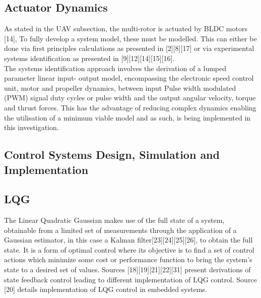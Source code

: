 \documentclass[12pt,a4paper,twoside]{report}
\begin{document}
			\subsection*{Actuator Dynamics}	
				As stated in the UAV subsection, the multi-rotor is actuated by BLDC motors [14], To fully develop a system model, these must be modelled. This can either be done via first principles calculations as presented in [2][8][17] or via experimental systems identification as presented in [9][12][14][15][16]. 
				\\
				The systems identification approach involves the derivation of a lumped parameter linear input- output model, encompassing the electronic speed control unit, motor and propeller dynamics, between input Pulse width modulated (PWM) signal duty cycles or pulse width and the output angular velocity, torque and thrust forces. This has the advantage of reducing complex dynamics enabling the utilisation of a minimum viable model and as such, is being implemented in this investigation.
				
		\subsection{Control Systems Design, Simulation and Implementation}
		
			\subsection*{LQG}
				The Linear Quadratic Gaussian makes use of the full state of a system, obtainable from a limited set of measurements through the application of a Gaussian estimator, in this case a Kalman filter[23][24][25][26], to obtain the full state. It is a form of optimal control where its objective is to find a set of control actions which minimize some cost or performance function to bring the system’s state to a desired set of values. Sources [18][19][21][22][31] present derivations of state feedback control leading to different implementation of LQG control. Source [20] details implementation of LQG control in embedded systems.
				
\end{document}
